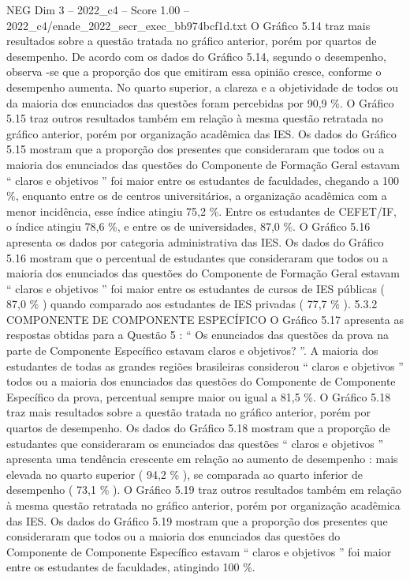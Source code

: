 \begin{textsample}{NEG Dim 3 – 2022\_c4 – Score 1.00 – 2022\_c4/enade\_2022\_secr\_exec\_bb974bcf1d.txt}
O Gráfico 5.14 traz mais resultados sobre a questão tratada no gráfico anterior, porém por quartos de desempenho.
De acordo com os dados do Gráfico 5.14, segundo o desempenho, observa -se que a proporção dos que emitiram essa opinião cresce, conforme o desempenho aumenta.
No quarto superior, a clareza e a objetividade de todos ou da maioria dos enunciados das questões foram percebidas por 90,9 \%.
O Gráfico 5.15 traz outros resultados também em relação à mesma questão retratada no gráfico anterior, porém por organização acadêmica das IES.
Os dados do Gráfico 5.15 mostram que a proporção dos presentes que consideraram que todos ou a maioria dos enunciados das questões do Componente de Formação Geral estavam “ claros e objetivos ” foi maior entre os estudantes de faculdades, chegando a 100 \%, enquanto entre os de centros universitários, a organização acadêmica com a menor incidência, esse índice atingiu 75,2 \%.
Entre os estudantes de CEFET/IF, o índice atingiu 78,6 \%, e entre os de universidades, 87,0 \%.
O Gráfico 5.16 apresenta os dados por categoria administrativa das IES.
Os dados do Gráfico 5.16 mostram que o percentual de estudantes que consideraram que todos ou a maioria dos enunciados das questões do Componente de Formação Geral estavam “ claros e objetivos ” foi maior entre os estudantes de cursos de IES públicas ( 87,0 \% ) quando comparado aos estudantes de IES privadas ( 77,7 \% ). 5.3.2 COMPONENTE DE COMPONENTE ESPECÍFICO O Gráfico 5.17 apresenta as respostas obtidas para a Questão 5 : “ Os enunciados das questões da prova na parte de Componente Específico estavam claros e objetivos? ”.
A maioria dos estudantes de todas as grandes regiões brasileiras considerou “ claros e objetivos ” todos ou a maioria dos enunciados das questões do Componente de Componente Específico da prova, percentual sempre maior ou igual a 81,5 \%.
O Gráfico 5.18 traz mais resultados sobre a questão tratada no gráfico anterior, porém por quartos de desempenho.
Os dados do Gráfico 5.18 mostram que a proporção de estudantes que consideraram os enunciados das questões “ claros e objetivos ” apresenta uma tendência crescente em relação ao aumento de desempenho : mais elevada no quarto superior ( 94,2 \% ), se comparada ao quarto inferior de desempenho ( 73,1 \% ).
O Gráfico 5.19 traz outros resultados também em relação à mesma questão retratada no gráfico anterior, porém por organização acadêmica das IES.
Os dados do Gráfico 5.19 mostram que a proporção dos presentes que consideraram que todos ou a maioria dos enunciados das questões do Componente de Componente Específico estavam “ claros e objetivos ” foi maior entre os estudantes de faculdades, atingindo 100 \%.

\end{textsample}
